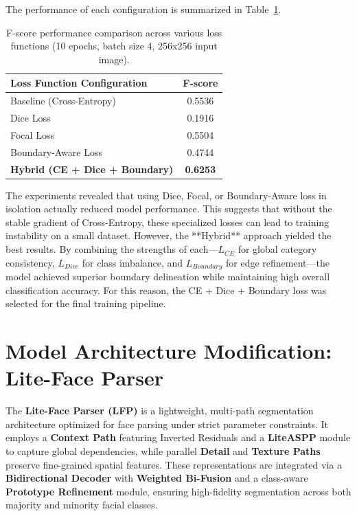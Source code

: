 \documentclass[10pt, a4paper]{article} %
\begin{document}
The performance of each configuration is summarized in Table~\ref{tab:loss_results}.

\begin{table}[h]
\centering
\caption{F-score performance comparison across various loss functions (10 epochs, batch size 4, 256x256 input image).}
\label{tab:loss_results}
\begin{tabular}{@{}lc@{}}
\toprule
Loss Function Configuration & F-score \\ \midrule
Baseline (Cross-Entropy) & 0.5536 \\
Dice Loss & 0.1916 \\
Focal Loss & 0.5504 \\
Boundary-Aware Loss & 0.4744 \\
\textbf{Hybrid (CE + Dice + Boundary)} & \textbf{0.6253} \\ \bottomrule
\end{tabular}
\end{table}

The experiments revealed that using Dice, Focal, or Boundary-Aware loss in isolation actually reduced model performance. This suggests that without the stable gradient of Cross-Entropy, these specialized losses can lead to training instability on a small dataset. However, the **Hybrid** approach yielded the best results. By combining the strengths of each—$L_{CE}$ for global category consistency, $L_{Dice}$ for class imbalance, and $L_{Boundary}$ for edge refinement—the model achieved superior boundary delineation while maintaining high overall classification accuracy. For this reason, the CE + Dice + Boundary loss was selected for the final training pipeline.

\section{Model Architecture Modification: Lite-Face Parser}

The \textbf{Lite-Face Parser (LFP)} is a lightweight, multi-path segmentation architecture optimized for face parsing under strict parameter constraints. It employs a \textbf{Context Path} featuring Inverted Residuals and a \textbf{LiteASPP} module to capture global dependencies, while parallel \textbf{Detail} and \textbf{Texture Paths} preserve fine-grained spatial features. These representations are integrated via a \textbf{Bidirectional Decoder} with \textbf{Weighted Bi-Fusion} and a class-aware \textbf{Prototype Refinement} module, ensuring high-fidelity segmentation across both majority and minority facial classes.
\end{document}
